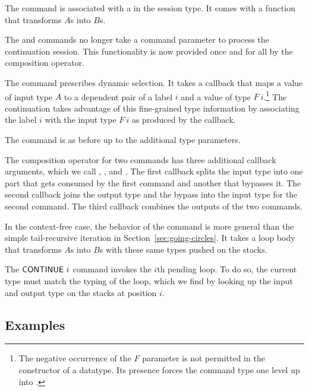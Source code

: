\documentclass[acmsmall,screen]{acmart}
\begin{document}
The {\ACSKIP} command is associated with a {\Atcfskip} in the session
type. It comes with a function that transforms $A$s into $B$s.

The {\ACSEND} and {\ACRECV} commands no longer take a command parameter
to process the continuation session. This functionality is now
provided once and for all by the composition operator.

The command {\ACSELECT} prescribes dynamic selection. It takes a
callback that maps a value of input type $A$ to a dependent pair of a
label $i$ and a value of type $F~i$.\footnote{The negative occurrence
  of the $F$ parameter is not permitted in the constructor of a
  {\ASet} datatype. Its presence forces the command type one level up
  into {\ASetOne}.} The continuation takes advantage of this
fine-grained type information by associating the label $i$ with the
input type $F~i$ as produced by the callback.

The {\ACCHOICE} command is as before up to the additional type parameters.

The composition operator for two commands has three additional
callback arguments, which we call {\Asplit}, {\Across}, and
{\Ajoin}. The first callback {\Asplit} splits the input type into one part that gets
consumed by the first command and another that bypasses it.
The second callback {\Across} joins the output type and the bypass into the
input type for the second command.
The third callback {\Ajoin} combines the outputs of the two commands.

In the context-free case, the behavior of the {\AMU} command is more
general than the simple tail-recursive iteration in
Section~\ref{sec:going-circles}. It takes a loop body that transforms
$A$s into $B$s with these same types pushed on the stacks.

The {$\ACONTINUE~i$} command invokes the $i$th pending loop. To do so,
the current type must match the typing of the loop, which we find by
looking up the input and output type on the stacks at position $i$.

\subsection{Examples}
\label{sec:examples}
\end{document}
